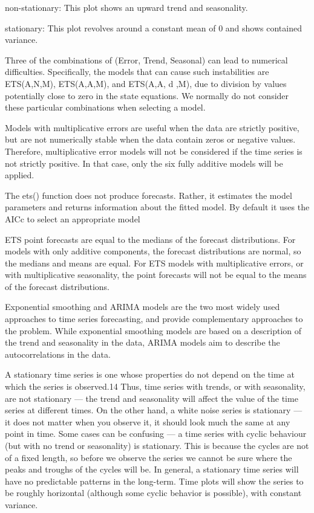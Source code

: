 \documentclass[]{book}
\begin{document}
non-stationary: This plot shows an upward trend and seasonality.

stationary: This plot revolves around a constant mean of 0 and shows contained variance.

Three of the combinations of (Error, Trend, Seasonal) can lead to numerical difficulties. Specifically, the models that can cause such instabilities are ETS(A,N,M), ETS(A,A,M), and ETS(A,A, d ,M), due to division by values potentially close to zero in the state equations. We normally do not consider these particular combinations when selecting a model.

Models with multiplicative errors are useful when the data are strictly positive, but are not numerically stable when the data contain zeros or negative values. Therefore, multiplicative error models will not be considered if the time series is not strictly positive. In that case, only the six fully additive models will be applied.

The ets() function does not produce forecasts. Rather, it estimates the model parameters and returns information about the fitted model. By default it uses the AICc to select an appropriate model

ETS point forecasts are equal to the medians of the forecast distributions. For models with only additive components, the forecast distributions are normal, so the medians and means are equal. For ETS models with multiplicative errors, or with multiplicative seasonality, the point forecasts will not be equal to the means of the forecast distributions.

Exponential smoothing and ARIMA models are the two most widely used approaches to time series forecasting, and provide complementary approaches to the problem. While exponential smoothing models are based on a description of the trend and seasonality in the data, ARIMA models aim to describe the autocorrelations in the data.

A stationary time series is one whose properties do not depend on the time at which the series is observed.14 Thus, time series with trends, or with seasonality, are not stationary --- the trend and seasonality will affect the value of the time series at different times. On the other hand, a white noise series is stationary --- it does not matter when you observe it, it should look much the same at any point in time. Some cases can be confusing --- a time series with cyclic behaviour (but with no trend or seasonality) is stationary. This is because the cycles are not of a fixed length, so before we observe the series we cannot be sure where the peaks and troughs of the cycles will be. In general, a stationary time series will have no predictable patterns in the long-term. Time plots will show the series to be roughly horizontal (although some cyclic behavior is possible), with constant variance.
\end{document}
